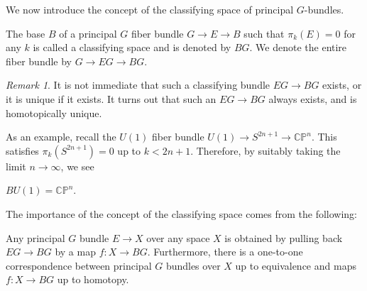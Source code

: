 \documentclass[12pt]{article}
\numberwithin{equation}{section}
\theoremstyle{remark}
\newtheorem{remark}[definition]{Remark}
\def\CP{\mathbb{CP}}
\begin{document}
We now introduce the concept of the classifying space of principal $G$-bundles.

\begin{definition}
The base $B$ of a principal $G$ fiber bundle $G\to E\to B$ such that 
$\pi_k(E)=0$ for any $k$
is called a classifying space and is denoted by $BG$.
We denote the entire fiber bundle by $G\to EG\to BG$.
\end{definition}

\begin{remark}
It is not immediate that such a classifying bundle $EG\to BG$ exists,
or it is unique if it exists. 
It turns out that such an $EG\to BG$ always exists, and is homotopically unique.
\end{remark}

As an example, recall the $U(1)$ fiber bundle $U(1)\to S^{2n+1}\to \CP^n$.
This satisfies $\pi_k(S^{2n+1})=0$ up to $k<2n+1$.
Therefore, by suitably taking the limit $n\to \infty$, we see
\begin{example}
$BU(1)=\CP^n$.
\end{example}

The importance of the concept of the classifying space comes from the following:

\begin{theorem}
\label{thm:classifying}
Any principal $G$ bundle $E\to X$ over any space $X$ is obtained by pulling back $EG\to BG$ by a map $f: X\to BG$.
Furthermore, there is a one-to-one correspondence between
principal $G$ bundles over $X$ up to equivalence
and maps $f:X\to BG$ up to homotopy.
\end{theorem}
\end{document}
